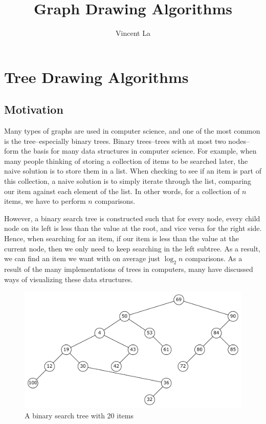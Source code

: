 \documentclass[11pt]{report}
\title{Graph Drawing Algorithms}
\author{Vincent La}
\begin{document}
    
\maketitle
\tableofcontents

\chapter{Tree Drawing Algorithms}
\section{Motivation}
Many types of graphs are used in computer science, and one of the most common is the tree--especially binary trees. Binary trees--trees with at most two nodes--form the basis for many data structures in computer science. For example, when many people thinking of storing a collection of items to be searched later, the naive solution is to store them in a list. When checking to see if an item is part of this collection, a naive solution is to simply iterate through the list, comparing our item against each element of the list. In other words, for a collection of $n$ items, we have to perform $n$ comparisons.

\bigskip

However, a binary search tree is constructed such that for every node, every child node on its left is less than the value at the root, and vice versa for the right side. Hence, when searching for an item, if our item is less than the value at the current node, then we only need to keep searching in the left subtree. As a result, we can find an item we want with on average just $\log_2{n}$ comparisons. As a result of the many implementations of trees in computers, many have discussed ways of visualizing these data structures.

\begin{figure}[H]
    \includegraphics[width=\linewidth]{report/bst_20.pdf}
    \caption{A binary search tree with 20 items}
\end{figure}
\end{document}
